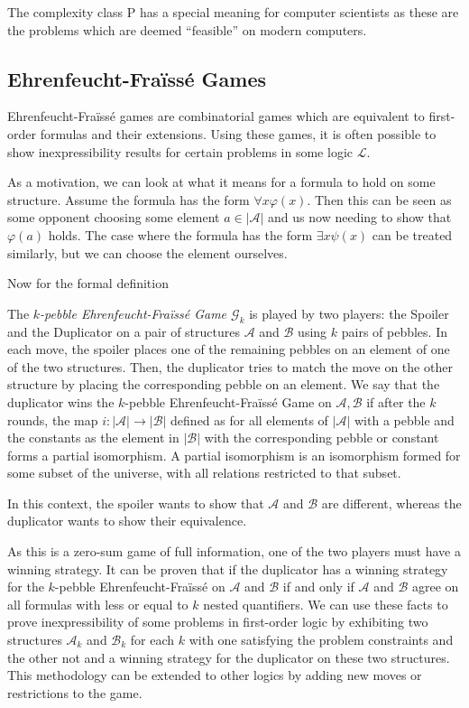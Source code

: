 The complexity class P has a special meaning for computer scientists as these are the problems which are deemed ``feasible'' on modern computers.

\subsection{Ehrenfeucht-Fraïssé Games}\label{subsec:ehrenfeucht-fraisse-games}

Ehrenfeucht-Fraïssé games are combinatorial games which are equivalent to first-order formulas and their extensions.
Using these games, it is often possible to show inexpressibility results for certain problems in some logic $\mathcal{L}$.

As a motivation, we can look at what it means for a formula to hold on some structure.
Assume the formula has the form $\forall x\varphi(x)$.
Then this can be seen as some opponent choosing some element $a \in |\mathcal{A}|$ and us now needing to show that $\varphi(a)$ holds.
The case where the formula has the form $\exists x\psi(x)$ can be treated similarly, but we can choose the element ourselves.

Now for the formal definition
\begin{define}
    The \emph{$k$-pebble Ehrenfeucht-Fraïssé Game $\mathcal{G}_k$} is played by two players: the Spoiler and the Duplicator on a pair of structures $\mathcal{A}$ and $\mathcal{B}$ using $k$ pairs of pebbles.
    In each move, the spoiler places one of the remaining pebbles on an element of one of the two structures.
    Then, the duplicator tries to match the move on the other structure by placing the corresponding pebble on an element.
    We say that the duplicator wins the $k$-pebble Ehrenfeucht-Fraïssé Game on $\mathcal{A}, \mathcal{B}$ if after the $k$ rounds, the map $i : |\mathcal{A}| \to |\mathcal{B}|$ defined as for all elements of $|\mathcal{A}|$ with a pebble and the constants as the element in $|\mathcal{B}|$ with the corresponding pebble or constant forms a partial isomorphism.
    A partial isomorphism is an isomorphism formed for some subset of the universe, with all relations restricted to that subset.
\end{define}

In this context, the spoiler wants to show that $\mathcal{A}$ and $\mathcal{B}$ are different, whereas the duplicator wants to show their equivalence.

As this is a zero-sum game of full information, one of the two players must have a winning strategy.
It can be proven that if the duplicator has a winning strategy for the $k$-pebble Ehrenfeucht-Fraïssé on $\mathcal{A}$ and $\mathcal{B}$ if and only if $\mathcal{A}$ and $\mathcal{B}$ agree on all formulas with less or equal to $k$ nested quantifiers.
We can use these facts to prove inexpressibility of some problems in first-order logic by exhibiting two structures $\mathcal{A}_k$ and $\mathcal{B}_k$ for each $k$ with one satisfying the problem constraints and the other not and a winning strategy for the duplicator on these two structures.
This methodology can be extended to other logics by adding new moves or restrictions to the game.


